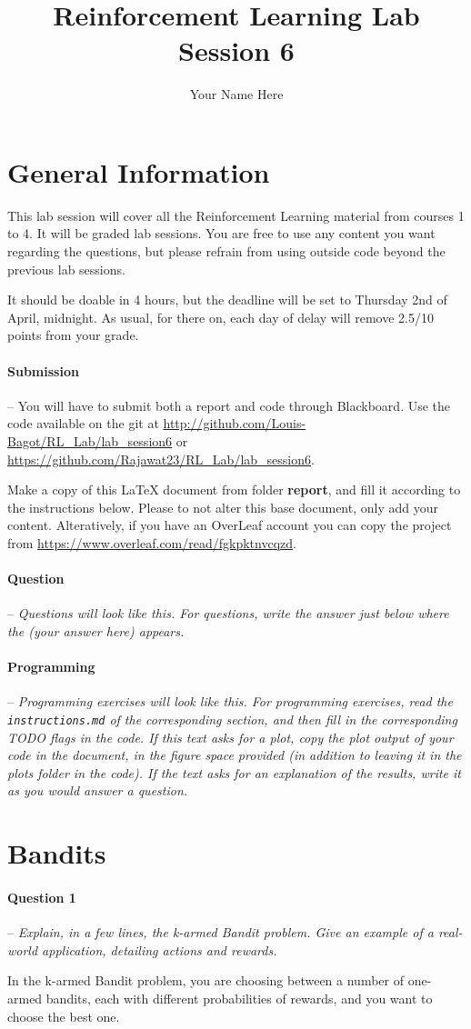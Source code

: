 \documentclass[a4paper]{article}
\title{Reinforcement Learning Lab Session 6}
\author{Your Name Here}
\newcommand{\question}[2]{
\paragraph{Question #1} -- \textit{#2}

}
\newcommand{\programming}[1]{
\paragraph{Programming} -- \textit{#1}

}
\begin{document}
\maketitle
\section*{General Information}
This lab session will cover all the Reinforcement Learning material from courses 1 to 4. It will be graded lab sessions. You are free to use any content you want regarding the questions, but please refrain from using outside code beyond the previous lab sessions.

It should be doable in 4 hours, but the deadline will be set to Thursday 2nd of April, midnight. As usual, for there on, each day of delay will remove 2.5/10 points from your grade.

\paragraph{Submission} --
You will have to submit both a report and code through Blackboard. Use the code available on the git at \url{http://github.com/Louis-Bagot/RL_Lab/lab_session6} or \url{https://github.com/Rajawat23/RL_Lab/lab_session6}.

Make a copy of this LaTeX document from folder \textbf{report}, and fill it according to the instructions below. Please to not alter this base document, only add your content. Alteratively, if you have an OverLeaf account you can copy the project from \url{https://www.overleaf.com/read/fgkpktnvcqzd}.

\question{}{Questions will look like this. For questions, write the answer just below where the (your answer here) appears.}
\programming{Programming exercises will look like this. For programming exercises, read the \texttt{instructions.md} of the corresponding section, and then fill in the corresponding TODO flags in the code. If this text asks for a plot, copy the plot output of your code in the document, in the figure space provided (in addition to leaving it in the plots folder in the code). If the text asks for an explanation of the results, write it as you would answer a question.}

\tableofcontents
\newpage

\section{Bandits}
\question{1}{Explain, in a few lines, the k-armed Bandit problem. Give an example of a real-world application, detailing actions and rewards.}
In the k-armed Bandit problem, you are choosing between a number of one-armed bandits, each with different probabilities of rewards, and you want to choose the best one.
\end{document}
